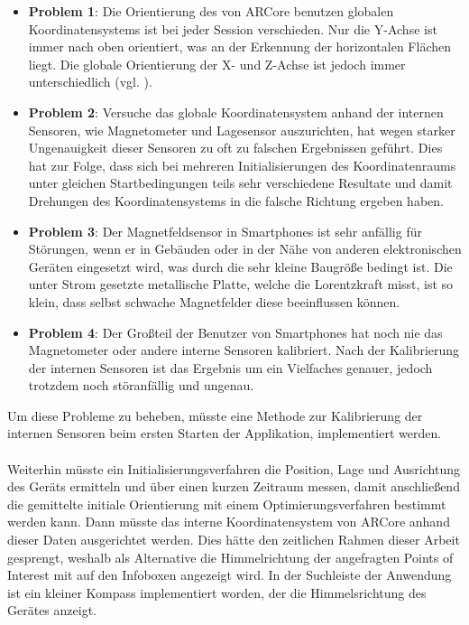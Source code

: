 \begin{itemize}

\item \textbf{Problem 1}: Die Orientierung des von ARCore benutzen globalen Koordinatensystems ist bei jeder Session verschieden. Nur die Y-Achse ist immer nach oben orientiert, was an der Erkennung der horizontalen Flächen liegt. Die globale Orientierung der X- und Z-Achse ist jedoch immer unterschiedlich (vgl. \cite{arcore_geo}).

\item \textbf{Problem 2}: Versuche das globale Koordinatensystem anhand der internen Sensoren, wie Magnetometer und Lagesensor auszurichten, hat wegen starker Ungenauigkeit dieser Sensoren zu oft zu falschen Ergebnissen geführt. Dies hat zur Folge, dass sich bei mehreren Initialisierungen des Koordinatenraums unter gleichen Startbedingungen teils sehr verschiedene Resultate und damit Drehungen des Koordinatensystems in die falsche Richtung ergeben haben. 

\item \textbf{Problem 3}: Der Magnetfeldsensor in Smartphones ist sehr anfällig für Störungen, wenn er in Gebäuden oder in der Nähe von anderen elektronischen Geräten eingesetzt wird, was durch die sehr kleine Baugröße bedingt ist. Die unter Strom gesetzte metallische Platte, welche die Lorentzkraft misst, ist so klein, dass selbst schwache Magnetfelder diese beeinflussen können.

\item \textbf{Problem 4}: Der Großteil der Benutzer von Smartphones hat noch nie das Magnetometer oder andere interne Sensoren kalibriert. Nach der Kalibrierung der internen Sensoren ist das Ergebnis um ein Vielfaches genauer, jedoch trotzdem noch störanfällig und ungenau.
\end{itemize}

Um diese Probleme zu beheben, müsste eine Methode zur Kalibrierung der internen Sensoren beim ersten Starten der Applikation, implementiert werden. \\ \\ Weiterhin müsste ein Initialisierungsverfahren die Position, Lage und Ausrichtung des Geräts ermitteln und über einen kurzen Zeitraum messen, damit anschließend die gemittelte initiale Orientierung mit einem Optimierungsverfahren bestimmt werden kann. Dann müsste das interne Koordinatensystem von ARCore anhand dieser Daten ausgerichtet werden. Dies hätte den zeitlichen Rahmen dieser Arbeit gesprengt, weshalb als Alternative die Himmelrichtung der angefragten Points of Interest mit auf den Infoboxen angezeigt wird. In der Suchleiste der Anwendung ist ein kleiner Kompass implementiert worden, der die Himmelsrichtung des Gerätes anzeigt. 

